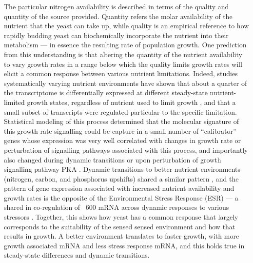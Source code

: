 The
particular nitrogen availability is described in terms of the quality
and quantity of the source provided. Quantity refers 
the molar availability of the nutrient that the yeast can take up,
while quality is an empirical reference to how rapidly budding
yeast can biochemically incorporate the nutrient into their metabolism
--- in essence the resulting rate of population growth. 
One prediction from this understanding is that
altering the quantity of the nutrient availability to vary growth
rates in a range below which the quality limits growth rates will
elicit a common response between various nutrient limitations.
Indeed, studies systematically varying nutrient environments have
shown that about a quarter of the transcriptome is differentially
expressed at different steady-state nutrient-limited growth states,
regardless of nutrient used to limit growth 
\parencite{brauer2008coordination,regenberg2006growth}, and that a
small subset of transcripts were regulated particular to the specific
limitation. 
Statistical modeling of this process
determined that the molecular signature of this growth-rate signalling
could be capture in a small number of “calibrator” genes whose
expression was very well correlated with changes in growth rate or
perturbation of signalling pathways associated with this process, and
importantly also changed during dynamic transitions or upon
perturbation of growth signalling pathway PKA 
\parencite{airoldi2009predicting}.
Dynamic transitions to better nutrient environments (nitrogen, carbon,
and phosphorus upshifts) shared a similar pattern 
\parencite{conway2012glucose}, 
and the pattern of gene expression associated with increased
nutrient availability and growth rates is the opposite of the
Environmental Stress Response (ESR) --- a shared in co-regulation of
~600 mRNA across dynamic responses to various stressors 
\parencite{gasch2000genomic}. 
Together, this shows how yeast has a common response that
largely corresponds to the suitability of the sensed sensed
environment and how that results in growth. 
A better environment translates to faster growth, with
more growth associated mRNA and less stress response mRNA, and this
holds true in steady-state differences and dynamic transitions.  

